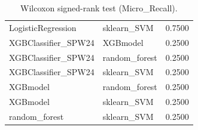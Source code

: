 \begin{table}[t]
\begin{tabular}{llr}
LogisticRegression & sklearn_SVM & 0.7500 \\
XGBClassifier_SPW24 & XGBmodel & 0.2500 \\
XGBClassifier_SPW24 & random_forest & 0.2500 \\
XGBClassifier_SPW24 & sklearn_SVM & 0.2500 \\
XGBmodel & random_forest & 0.2500 \\
XGBmodel & sklearn_SVM & 0.2500 \\
random_forest & sklearn_SVM & 0.2500 \\
\bottomrule
\end{tabular}
\caption{Wilcoxon signed-rank test (Micro_Recall).}
\label{tab:wilcoxon_Micro_Recall}
\end{table}